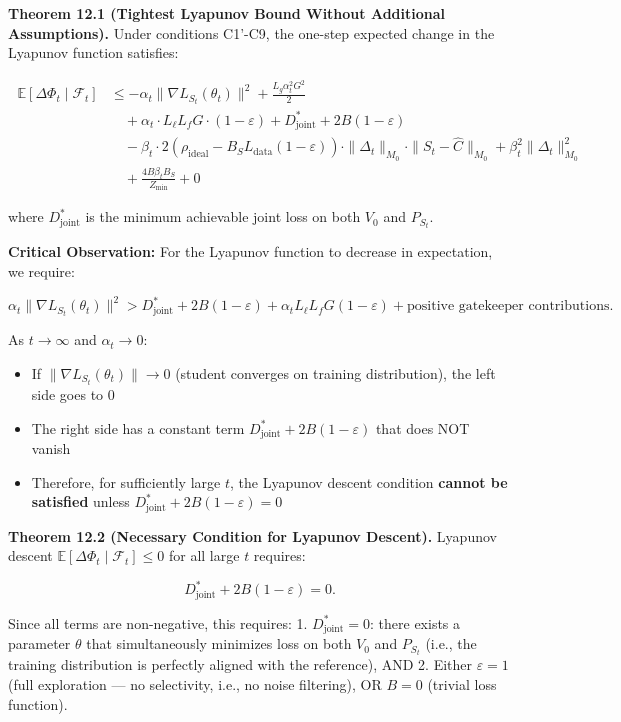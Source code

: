 \documentclass[
  12pt,
]{ctexart}
\providecommand{\tightlist}{%
  \setlength{\itemsep}{0pt}\setlength{\parskip}{0pt}}
\begin{document}
\textbf{Theorem 12.1 (Tightest Lyapunov Bound Without Additional
Assumptions).} Under conditions C1'-C9, the one-step expected change in
the Lyapunov function satisfies:

\[\boxed{\;\begin{aligned}
\mathbb{E}[\Delta\Phi_t \mid \mathcal{F}_t] &\leq -\alpha_t \|\nabla L_{S_t}(\theta_t)\|^2 + \frac{L_g \alpha_t^2 G^2}{2} \\
&\quad + \alpha_t \cdot L_\ell L_f G \cdot (1 - \varepsilon) + D_{\text{joint}}^* + 2B(1-\varepsilon) \\
&\quad - \beta_t \cdot 2(\rho_{\text{ideal}} - B_S L_{\text{data}}(1-\varepsilon)) \cdot \|\Delta_t\|_{M_0} \cdot \|S_t - \hat{C}\|_{M_0} + \beta_t^2 \|\Delta_t\|_{M_0}^2 \\
&\quad + \frac{4B \beta_t B_S}{Z_{\min}} + 0
\end{aligned}}\]

where \(D_{\text{joint}}^*\) is the minimum achievable joint loss on
both \(V_0\) and \(P_{S_t}\).

\textbf{Critical Observation:} For the Lyapunov function to decrease in
expectation, we require:

\[\alpha_t \|\nabla L_{S_t}(\theta_t)\|^2 > D_{\text{joint}}^* + 2B(1-\varepsilon) + \alpha_t L_\ell L_f G(1-\varepsilon) + \text{positive gatekeeper contributions}.\]

As \(t \to \infty\) and \(\alpha_t \to 0\):

\begin{itemize}
\tightlist
\item
  If \(\|\nabla L_{S_t}(\theta_t)\| \to 0\) (student converges on
  training distribution), the left side goes to 0
\item
  The right side has a constant term
  \(D_{\text{joint}}^* + 2B(1-\varepsilon)\) that does NOT vanish
\item
  Therefore, for sufficiently large \(t\), the Lyapunov descent
  condition \textbf{cannot be satisfied} unless
  \(D_{\text{joint}}^* + 2B(1-\varepsilon) = 0\)
\end{itemize}

\textbf{Theorem 12.2 (Necessary Condition for Lyapunov Descent).}
Lyapunov descent \(\mathbb{E}[\Delta\Phi_t \mid \mathcal{F}_t] \leq 0\)
for all large \(t\) requires:

\[D_{\text{joint}}^* + 2B(1-\varepsilon) = 0.\]

Since all terms are non-negative, this requires: 1.
\(D_{\text{joint}}^* = 0\): there exists a parameter \(\theta\) that
simultaneously minimizes loss on both \(V_0\) and \(P_{S_t}\) (i.e., the
training distribution is perfectly aligned with the reference), AND 2.
Either \(\varepsilon = 1\) (full exploration --- no selectivity, i.e.,
no noise filtering), OR \(B = 0\) (trivial loss function).
\end{document}
